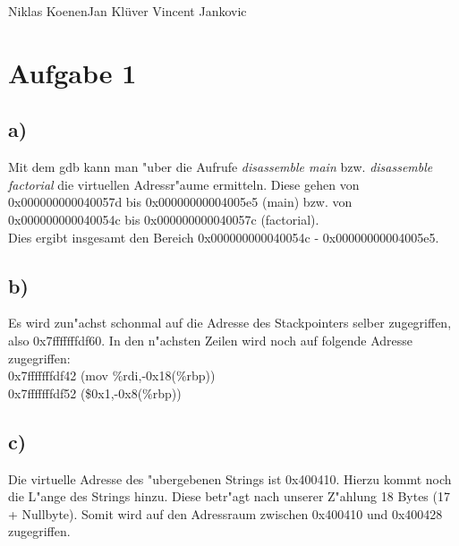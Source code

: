 \documentclass{ti2}
\begin{document}
%
                {Niklas Koenen}{Jan Klüver}%
                {Vincent Jankovic}{}%

\section*{Aufgabe 1} 
\subsection*{a)}
Mit dem gdb kann man "uber die Aufrufe \emph{disassemble main} bzw. \emph{disassemble factorial} die virtuellen Adressr"aume ermitteln. Diese gehen von 0x000000000040057d bis 0x00000000004005e5 (main) bzw. von 0x000000000040054c bis 0x000000000040057c (factorial). 
\\
Dies ergibt insgesamt den Bereich 0x000000000040054c - 0x00000000004005e5.
\subsection*{b)}
Es wird zun"achst schonmal auf die Adresse des Stackpointers selber zugegriffen, also 0x7fffffffdf60. In den n"achsten Zeilen wird noch auf folgende Adresse zugegriffen:
\\ 
0x7fffffffdf42 (mov \%rdi,-0x18(\%rbp))
\\
0x7fffffffdf52 (\$0x1,-0x8(\%rbp))
\subsection*{c)}
Die virtuelle Adresse des "ubergebenen Strings ist 0x400410. Hierzu kommt noch die L"ange des Strings hinzu. Diese betr"agt nach unserer Z"ahlung 18 Bytes (17 + Nullbyte). Somit wird auf den Adressraum zwischen 0x400410 und 0x400428 zugegriffen. 
\end{document}
